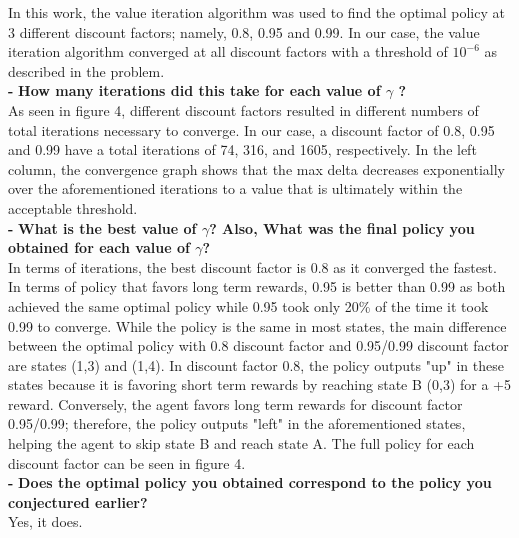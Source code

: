 \documentclass[11pt]{article}
\begin{document}
\noindent
In this work, the value iteration algorithm was used to find the optimal policy
at 3 different discount factors; namely, 0.8, 0.95 and 0.99. In our case, the
value iteration algorithm converged at all discount factors with a threshold of
$10^{-6}$ as described in the problem.\\


\noindent
\textbf{-}
\noindent
\textbf{How many iterations did this take for each value of $\gamma$ ?}
\\

\noindent
As seen in figure 4, different discount factors resulted in different numbers of
total iterations necessary to converge. In our case, a discount factor of 0.8,
0.95 and 0.99 have a total iterations of 74, 316, and 1605, respectively. In the
left column, the convergence graph shows that the max delta decreases
exponentially over the aforementioned iterations to a value that is ultimately
within the acceptable threshold.
\\

\noindent
\textbf{-}
\noindent
\textbf{What is the best value of $\gamma$? Also, What was the final policy you
obtained for each value of $\gamma$?}
\\

\noindent
In terms of iterations, the best discount factor is 0.8 as it converged the
fastest. In terms of policy that favors long term rewards, 0.95 is better than
0.99 as both achieved the same optimal policy while 0.95 took only 20\% of the
time it took 0.99 to converge. While the policy is the same in most states, the
main difference between the optimal policy with 0.8 discount factor and
0.95/0.99 discount factor are states (1,3) and (1,4). In discount factor 0.8,
the policy outputs "up" in these states because it is favoring short term
rewards by reaching state B (0,3) for a +5 reward. Conversely, the agent favors
long term rewards for discount factor 0.95/0.99; therefore, the policy outputs
"left" in the aforementioned states, helping the agent to skip state B and reach
state A. The full policy for each discount factor can be seen in figure 4.
\\

\noindent
\textbf{-}
\noindent
\textbf{Does the optimal policy you obtained correspond to the policy you
conjectured earlier?}
\\

\noindent
Yes, it does.
\\
\end{document}

